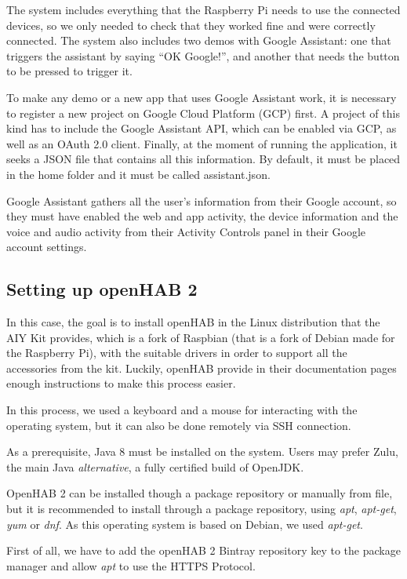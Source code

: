 The system includes everything that the Raspberry Pi needs to use the connected devices, so we only needed to check that they worked
fine and were correctly connected. The system also includes two demos with Google Assistant: one that triggers the assistant by saying
“OK Google!”, and another that needs the button to be pressed to trigger it.

To make any demo or a new app that uses Google Assistant work, it is necessary to register a new project on Google Cloud Platform
(GCP) first. A project of this kind has to include the Google Assistant API, which can be enabled via GCP, as well as an OAuth 2.0
client. Finally, at the moment of running the application, it seeks a JSON file that contains all this information. By default, it
must be placed in the home folder and it must be called assistant.json.

Google Assistant gathers all the user’s information from their Google account, so they must have enabled the web and app activity,
the device information and the voice and audio activity from their Activity Controls panel in their Google account settings.

\subsection{Setting up openHAB 2}
In this case, the goal is to install openHAB in the Linux distribution that the AIY Kit provides, which is a fork of Raspbian
(that is a fork of Debian made for the Raspberry Pi), with the suitable drivers in order to support all the accessories from the kit.
Luckily, openHAB provide in their documentation pages\cite{openHABDocs} enough instructions to make this process easier.

In this process, we used a keyboard and a mouse for interacting with the operating system, but it can also be done remotely via
SSH connection.

As a prerequisite, Java 8 must be installed on the system. Users may prefer Zulu, the main Java \textit{alternative}, a fully
certified build of OpenJDK.\cite{zuluWebsite}

OpenHAB 2 can be installed though a package repository or manually from file, but it is recommended to install through a package
repository, using \textit{apt}, \textit{apt-get}, \textit{yum} or \textit{dnf}. As this operating system is based on Debian, we
used \textit{apt-get}.

First of all, we have to add the openHAB 2 Bintray repository key to the package manager and allow \textit{apt} to use the HTTPS
Protocol.


